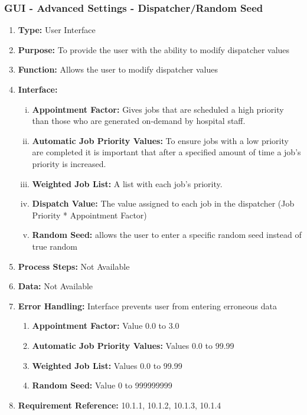 \documentclass[paper=letter, fontsize=10pt]{scrartcl}
\numberwithin{equation}{section}		%
\numberwithin{figure}{section}			%
\numberwithin{table}{section}				%
\begin{document}
\subsubsection{GUI - Advanced Settings - Dispatcher/Random Seed}
\begin{enumerate}[]
	\item \textbf{Type:} User Interface
	\item \textbf{Purpose:} To provide the user with the ability to modify dispatcher values
	\item \textbf{Function:} Allows the user to modify dispatcher values
	\item \textbf{Interface:}  
	\begin{enumerate}[(i)]
		\item \textbf{Appointment Factor:} Gives jobs that are scheduled a high priority than those who are generated on-demand by hospital staff.
		\item \textbf{Automatic Job Priority Values:}  To ensure jobs with a low priority are completed it is important that after a specified amount of time a job's priority is increased.  
		\item \textbf{Weighted Job List:} A list with each job's priority.
		\item \textbf{Dispatch Value:} The value assigned to each job in the dispatcher (Job Priority * Appointment Factor)
		\item \textbf{Random Seed:} allows the user to enter a specific random seed instead of true random
	\end{enumerate}
	\item \textbf{Process Steps:} Not Available
	\item \textbf{Data:} Not Available
	\item \textbf{Error Handling:} Interface prevents user from entering erroneous data 
	\begin{enumerate}[]
		\item \textbf{Appointment Factor:} Value 0.0 to 3.0
		\item \textbf{Automatic Job Priority Values:} Values 0.0 to 99.99
		\item \textbf{Weighted Job List:} Values 0.0 to 99.99
		\item \textbf{Random Seed:} Value 0 to 999999999
	\end{enumerate}
	\item \textbf{Requirement Reference:} 10.1.1, 10.1.2, 10.1.3, 10.1.4
\end{enumerate}
\end{document}
